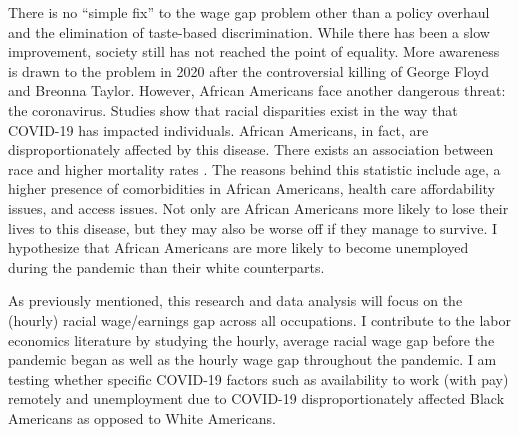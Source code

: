 \documentclass[12pt, english]{article}
\begin{document}
There is no “simple fix” to the wage gap problem other than a policy overhaul and the elimination of taste-based discrimination. While there has been a slow improvement, society still has not reached the point of equality. More awareness is drawn to the problem in 2020 after the controversial killing of George Floyd and Breonna Taylor. However, African Americans face another dangerous threat: the coronavirus. Studies show that racial disparities exist in the way that COVID-19 has impacted individuals. African Americans, in fact, are disproportionately affected by this disease. There exists an association between race and higher mortality rates \citet{CLAY2021}. The reasons behind this statistic include age, a higher presence of comorbidities in African Americans, health care affordability issues, and access issues. Not only are African Americans more likely to lose their lives to this disease, but they may also be worse off if they manage to survive. I hypothesize that African Americans are more likely to become unemployed during the pandemic than their white counterparts. 

As previously mentioned, this research and data analysis will focus on the (hourly) racial wage/earnings gap across all occupations. I contribute to the labor economics literature by studying the hourly, average racial wage gap before the pandemic began as well as the hourly wage gap throughout the pandemic. I am testing whether specific COVID-19 factors such as availability to work (with pay) remotely and unemployment due to COVID-19 disproportionately affected Black Americans as opposed to White Americans.
\end{document}
